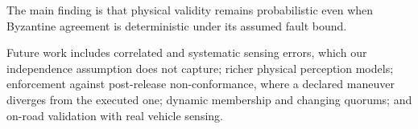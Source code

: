 \documentclass[letterpaper,10pt,conference]{IEEEtran}
\begin{document}
The main finding is that physical validity remains probabilistic even
when Byzantine agreement is deterministic under its assumed fault bound.

Future work includes correlated and systematic sensing errors, which our
independence assumption does not capture; richer physical perception
models; enforcement against post-release non-conformance, where a
declared maneuver diverges from the executed one; dynamic membership and
changing quorums; and on-road validation with real vehicle sensing.
\end{document}
